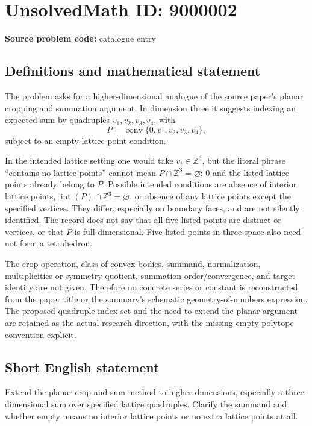 \documentclass[11pt]{article}
\newcommand{\Z}{\mathbb{Z}}
\begin{document}
\section*{UnsolvedMath ID: 9000002}
\textbf{Source problem code:} catalogue entry
\subsection{Definitions and mathematical statement}
The problem asks for a higher-dimensional analogue of the source paper's planar cropping and summation argument. In dimension three it suggests indexing an expected sum by quadruples $v_1,v_2,v_3,v_4$, with
\[
P=\operatorname{conv}\{0,v_1,v_2,v_3,v_4\},
\]
subject to an empty-lattice-point condition.

In the intended lattice setting one would take $v_i\in\Z^3$, but the literal phrase ``contains no lattice points'' cannot mean $P\cap\Z^3=\varnothing$: $0$ and the listed lattice points already belong to $P$. Possible intended conditions are absence of interior lattice points, $\operatorname{int}(P)\cap\Z^3=\varnothing$, or absence of any lattice points except the specified vertices. They differ, especially on boundary faces, and are not silently identified. The record does not say that all five listed points are distinct or vertices, or that $P$ is full dimensional. Five listed points in three-space also need not form a tetrahedron.

The crop operation, class of convex bodies, summand, normalization, multiplicities or symmetry quotient, summation order/convergence, and target identity are not given. Therefore no concrete series or constant is reconstructed from the paper title or the summary's schematic geometry-of-numbers expression. The proposed quadruple index set and the need to extend the planar argument are retained as the actual research direction, with the missing empty-polytope convention explicit.
\subsection{Short English statement}
Extend the planar crop-and-sum method to higher dimensions, especially a three-dimensional sum over specified lattice quadruples. Clarify the summand and whether empty means no interior lattice points or no extra lattice points at all.
\end{document}
